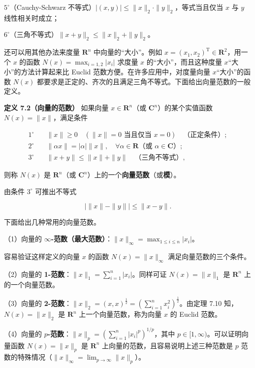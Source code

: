 \documentclass[
  10pt,
  fontset=fandol]{ctexart}
\begin{document}
\(5^\circ\)（Cauchy-Schwarz 不等式）\(|(x,y)|\leqslant\|x\|_2\cdot\|y\|_2\)，等式当且仅当 \(x\) 与 \(y\) 线性相关时成立；

\(6^\circ\)（三角不等式）\(\|x+y\|_2\leqslant\|x\|_2+\|y\|_2\)。

还可以用其他办法来度量 \(\mathbf R^n\) 中向量的``大小''。例如 \(x=(x_1,x_2)^{\mathrm T}\in\mathbf R^2\)，用一个 \(x\) 的函数 \(N(x)=\max_{i=1,2}|x_i|\) 求度量 \(x\) 的``大小''，而且这种度量 \(x\)``大小''的方法计算起来比 Euclid 范数方便。在许多应用中，对度量向量 \(x\)``大小''的函数 \(N(x)\) 都要求是正定的、齐次的且满足三角不等式。下面给出向量范数的一般定义。

\textbf{定义 7.2（向量的范数）} 如果向量 \(x\in\mathbf R^n\)（或 \(\mathbf C^n\)）的某个实值函数 \(N(x)=\|x\|\)，满足条件

\[
\begin{aligned}
1^\circ\quad &\|x\|\geqslant0\quad(\|x\|=0\text{ 当且仅当 }x=0)\quad\text{（正定条件）};\\
2^\circ\quad &\|\alpha x\|=|\alpha|\|x\|,\quad\forall\alpha\in\mathbf R\text{（或 }\alpha\in\mathbf C\text{）};\\
3^\circ\quad &\|x+y\|\leqslant\|x\|+\|y\|\quad\text{（三角不等式）},
\end{aligned}
\tag{7.5.1}
\]

则称 \(N(x)\) 是 \(\mathbf R^n\)（或 \(\mathbf C^n\)）上的一个\textbf{向量范数}（或\textbf{模}）。

由条件 \(3^\circ\) 可推出不等式

\[
\big|\|x\|-\|y\|\big|\leqslant\|x-y\|.
\tag{7.5.2}
\]

下面给出几种常用的向量范数。

（1）向量的 \textbf{\(\infty\)-范数（最大范数）}：\(\|x\|_\infty=\max_{1\leqslant i\leqslant n}|x_i|\)。

容易验证这样定义的向量 \(x\) 的函数 \(N(x)=\|x\|_\infty\) 满足向量范数的三个条件。

（2）向量的 \textbf{1-范数}：\(\|x\|_1=\sum_{i=1}^{n}|x_i|\)。同样可证 \(N(x)=\|x\|_1\) 是 \(\mathbf R^n\) 上的一个向量范数。

（3）向量的 \textbf{2-范数}：\(\|x\|_2=(x,x)^{\frac12}=\left(\sum_{i=1}^{n}x_i^2\right)^{\frac12}\)。由定理 7.10 知，\(N(x)=\|x\|_2\) 是 \(\mathbf R^n\) 上一个向量范数，称为向量 \(x\) 的 Euclid 范数。

（4）向量的 \textbf{\(p\)-范数}：\(\|x\|_p=\left(\sum_{i=1}^{n}|x_i|^p\right)^{1/p}\)，其中 \(p\in[1,\infty)\)。可以证明向量函数 \(N(x)=\|x\|_p\) 是 \(\mathbf R^n\) 上向量的范数，且容易说明上述三种范数是 \(p\) 范数的特殊情况（\(\|x\|_\infty=\lim_{p\to\infty}\|x\|_p\)）。
\end{document}
